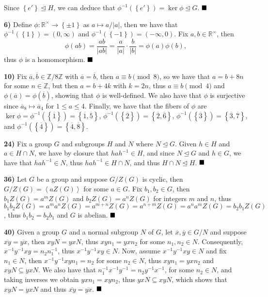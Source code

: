 \documentclass[12pt]{article}
\newcommand{\Z}{\mathbb{Z}}
\newcommand{\R}{\mathbb{R}}
\newcommand{\angleb}[1]{\left\langle#1\right\rangle}
\newcommand{\braceb}[1]{\left\{#1\right\}}
\newcommand{\vertb}[1]{\left\vert#1\right\vert}
\newcommand{\ovl}[1]{\overline{#1}}
\newcommand{\normsub}{\trianglelefteq}
\newcommand{\done}{\ensuremath{\strut\hfill\blacksquare}}
\begin{document}
Since \( \braceb{e'} \normsub H \), we can deduce that
\( \phi^{-1}(\braceb{e'}) = \ker\phi \normsub G \).
\done

\textbf{6)}
Define \( \phi : \R^\times \to \braceb{\pm 1} \) as
\( a \mapsto a/\vertb{a} \), then we have that
\( \phi^{-1}(\braceb{1}) = (0, \infty) \) and
\( \phi^{-1}(\braceb{-1}) = (-\infty, 0) \).
Fix \( a, b \in \R^\times \), then
\[
	\phi(ab)
	= \frac{ab}{\vertb{ab}}
	= \frac{a}{\vertb{a}} \cdot \frac{b}{\vertb{b}}
	= \phi(a)\phi(b),
\]
thus \( \phi \) is a homomorphism.
\done

\textbf{10)}
Fix \( \ovl{a}, \ovl{b} \in \Z/8\Z \) with \( \ovl{a} = \ovl{b} \), then
\( a \equiv b \pmod{8} \), so we have that \( a = b + 8n \) for some
\( n \in \Z \), but then \( a = b + 4k \) with \( k = 2n \), thus
\( a \equiv b \pmod{4} \) and \( \phi(\ovl{a}) = \phi(\ovl{b}) \), showing
that \( \phi \) is well-defined.
We also have that \( \phi \) is surjective since
\( \ovl{a}_8 \mapsto \ovl{a}_4 \) for \( 1 \leq a \leq 4 \).
Finally, we have that the fibers of \( \phi \) are
\( \ker\phi = \phi^{-1}(\braceb{\ovl{1}}) = \braceb{\ovl{1}, \ovl{5}} \),
\( \phi^{-1}(\braceb{\ovl{2}}) = \braceb{\ovl{2}, \ovl{6}} \),
\( \phi^{-1}(\braceb{\ovl{3}}) = \braceb{\ovl{3}, \ovl{7}} \), and
\( \phi^{-1}(\braceb{\ovl{4}}) = \braceb{\ovl{4}, \ovl{8}} \).

\textbf{24)}
Fix a group \( G \) and subgroups \( H \) and \( N \) where \( N \normsub G \).
Given \( h \in H \) and \( a \in H \cap N \), we have by closure that
\( hah^{-1} \in H \), and since \( N \normsub G \) and \( h \in G \), we have
that \( hah^{-1} \in N \), thus \( hah^{-1} \in H \cap N \), and thus
\( H \cap N \normsub H \).
\done

\textbf{36)}
Let \( G \) be a group and suppose \( G/Z(G) \) is cyclic, then
\( G/Z(G) = \angleb{aZ(G)} \) for some \( a \in G \).
Fix \( b_1, b_2 \in G \), then \( b_1Z(G) = a^mZ(G) \) and
\( b_2Z(G) = a^nZ(G) \) for integers \( m \) and \( n \), thus
\(
	b_1b_2Z(G)
	= a^ma^nZ(G)
	= a^{m + n}Z(G)
	= a^{n + m}Z(G)
	= a^na^mZ(G)
	= b_2b_1Z(G)
\),
thus \( b_1b_2 = b_2b_1 \) and \( G \) is abelian.
\done

\textbf{40)}
Given a group \( G \) and a normal subgroup \( N \) of \( G \), let
\( \ovl{x}, \ovl{y} \in G/N \) and suppose \( \ovl{xy} = \ovl{yx} \), then
\( xyN = yxN \), thus \( xyn_1 = yxn_2 \) for some \( n_1, n_2 \in N \).
Consequently, \( x^{-1}y^{-1}xy = n_2n_1^{-1} \), thus
\( x^{-1}y^{-1}xy \in N \).
Now, assume \( x^{-1}y^{-1}xy \in N \) and fix \( n_1 \in N \), then
\( x^{-1}y^{-1}xyn_1 = n_2 \) for some \( n_2 \in N \), thus
\( xyn_1 = yxn_2 \) and \( xyN \subseteq yxN \).
We also have that \( n_1^{-1}x^{-1}y^{-1} = n_2y^{-1}x^{-1} \), for some
\( n_2 \in N \), and taking inverses we obtain \( yxn_1 = xyn_2 \), thus
\( yxN \subseteq xyN \), which shows that \( xyN = yxN \) and thus
\( \ovl{xy} = \ovl{yx } \).
\done
\end{document}
